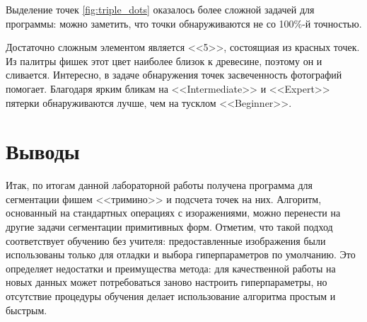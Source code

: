 \documentclass[12pt]{article}
\begin{document}
Выделение точек \autoref{fig:triple_dots} оказалось более сложной задачей для программы: можно заметить, что точки обнаруживаются не со 100\%-й точностью.

Достаточно сложным элементом является <<5>>, состоящиая из красных точек. Из палитры фишек этот цвет наиболее близок к древесине, поэтому он и сливается. Интересно, в задаче обнаружения точек засвеченность фотографий помогает. Благодаря ярким бликам на <<Intermediate>> и <<Expert>> пятерки обнаруживаются лучше, чем на тусклом <<Beginner>>.

\section{Выводы}
Итак, по итогам данной лабораторной работы получена программа для сегментации фишем <<тримино>> и подсчета точек на них. Алгоритм, основанный на стандартных операциях с изоражениями, можно перенести на другие задачи сегментации примитивных форм. Отметим, что такой подход соответствует обучению без учителя: предоставленные изображения были использованы только для отладки и выбора гиперпараметров по умолчанию. Это определяет недостатки и преимущества метода: для качественной работы на новых данных может потребоваться заново настроить гиперпараметры, но отсутствие процедуры обучения делает использование алгоритма простым и быстрым.
\end{document}
